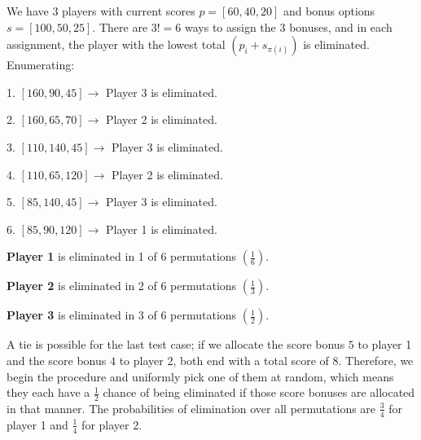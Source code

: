 We have 3 players with current scores $p = [60, 40, 20]$ and bonus options $s = [100, 50, 25]$. There are $3! = 6$ ways to assign the 3 bonuses, and in each assignment, the player with the lowest total $(p_i + s_{\pi(i)})$ is eliminated. Enumerating:   

1. $[160,90,45] \to $ Player 3 is eliminated.  

 
2. $[160,65,70]  \to $ Player 2 is eliminated. 

3. $[110,140,45]  \to $ Player 3 is eliminated.  

4. $[110,65,120]  \to $ Player 2 is eliminated. 

5. $[85,140,45]  \to $ Player 3 is eliminated. 

6. $[85,90,120]  \to $ Player 1 is eliminated. 


\textbf{Player 1} is eliminated in 1 of 6 permutations $(\frac{1}{6})$.   

 
\textbf{Player 2} is eliminated in 2 of 6 permutations $(\frac{1}{3})$.    


\textbf{Player 3} is eliminated in 3 of 6 permutations $(\frac{1}{2})$.

A tie is possible for the last test case; if we allocate the score bonus $5$ to player 1 and the score bonus $4$ to player 2, both end with a total score of $8$. Therefore, we begin the procedure and uniformly pick one of them at random, which means they each have a $\frac{1}{2}$ chance of being eliminated if those score bonuses are allocated in that manner. The probabilities of elimination over all permutations are $\frac{3}{4}$ for player 1 and $\frac{1}{4}$ for player 2.
